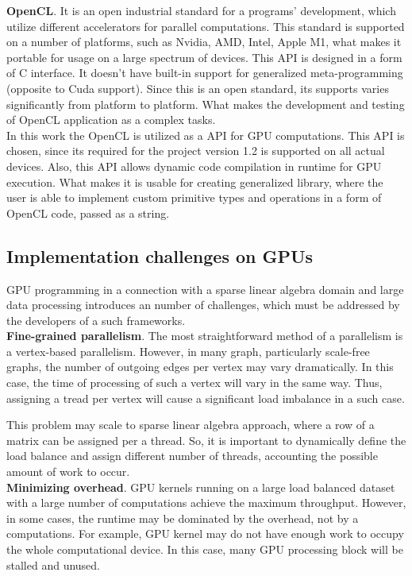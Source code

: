 \textbf{OpenCL}. It is an open industrial standard for a programs' development, which utilize different accelerators for parallel computations. This standard is supported on a number of platforms, such as Nvidia, AMD, Intel, Apple M1, what makes it portable for usage on a large spectrum of devices. This API is designed in a form of C interface. It doesn't have built-in support for generalized meta-programming (opposite to Cuda support). Since this is an open standard, its supports varies significantly from platform to platform. What makes the development and testing of OpenCL application as a complex tasks.\\

In this work the OpenCL is utilized as a API for GPU computations. This API is chosen, since its required for the project version 1.2 is supported on all actual devices. Also, this API allows dynamic code compilation in runtime for GPU execution. What makes it is usable for creating generalized library, where the user is able to implement custom primitive types and operations in a form of OpenCL code, passed as a string.

\subsection{Implementation challenges on GPUs}

GPU programming in a connection with a sparse linear algebra domain and large data processing introduces an number of challenges, which must be addressed by the developers of a such frameworks.\\

\textbf{Fine-grained parallelism}. The most straightforward method of a parallelism is a vertex-based parallelism. However, in many graph, particularly scale-free graphs, the number of outgoing edges per vertex may vary dramatically. In this case, the time of processing of such a vertex will vary in the same way. Thus, assigning a tread per vertex will cause a significant load imbalance in a such case. 

This problem may scale to sparse linear algebra approach, where a row of a matrix can be assigned per a thread. So, it is important to dynamically define the load balance and assign different number of threads, accounting the possible amount of work to occur.\\

\textbf{Minimizing overhead}. GPU kernels running on a large load balanced dataset with a large number of computations achieve the maximum throughput. However, in some cases, the runtime may be dominated by the overhead, not by a computations. For example, GPU kernel may do not have enough work to occupy the whole computational device. In this case, many GPU processing block will be stalled and unused. 

